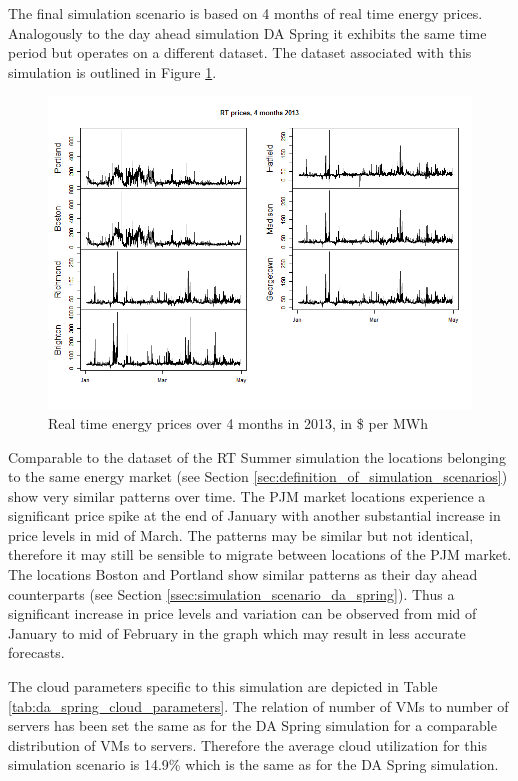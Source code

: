 The final simulation scenario is based on 4 months of real time energy prices. Analogously to the day ahead simulation DA Spring it exhibits the same time period but operates on a different dataset. The dataset associated with this simulation is outlined in Figure \ref{fig:rt_sim_2013_4months}. 

\begin{figure}[htbp]
	\centering
		\includegraphics[width=1.00\textwidth]{figures/evaluation_and_results/rt_sim_2013_4months.png}
	\caption{Real time energy prices over 4 months in 2013, in \$ per MWh}
	\label{fig:rt_sim_2013_4months}
\end{figure}

Comparable to the dataset of the RT Summer simulation the locations belonging to the same energy market (see Section \ref{sec:definition_of_simulation_scenarios}) show very similar patterns over time. The PJM market locations experience a significant price spike at the end of January with another substantial increase in price levels in mid of March. The patterns may be similar but not identical, therefore it may still be sensible to migrate between locations of the PJM market. The locations Boston and Portland show similar patterns as their day ahead counterparts (see Section \ref{ssec:simulation_scenario_da_spring}). Thus a significant increase in price levels and variation can be observed from mid of January to mid of February in the graph which may result in less accurate forecasts. 

The cloud parameters specific to this simulation are depicted in Table \ref{tab:da_spring_cloud_parameters}. The relation of number of VMs to number of servers has been set the same as for the DA Spring simulation for a comparable distribution of VMs to servers. Therefore the average cloud utilization for this simulation scenario is 14.9\% which is the same as for the DA Spring simulation. 

